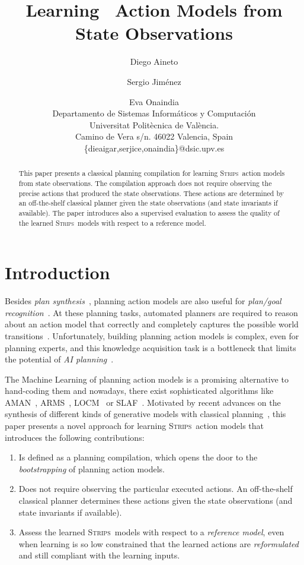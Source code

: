 \documentclass{article}
\title{Learning \strips\ Action Models from State Observations}
\author{Diego Aineto\and Sergio Jim\'enez\and Eva Onaindia\\
{\small Departamento de Sistemas Inform\'aticos y Computaci\'on}\\
{\small Universitat Polit\`ecnica de Val\`encia.}\\
{\small Camino de Vera s/n. 46022 Valencia, Spain}\\
{\small \{dieaigar,serjice,onaindia\}@dsic.upv.es}}
\newcommand{\strips}{\textsc{Strips}}     %
\begin{document}
\maketitle

\begin{abstract}
This paper presents a classical planning compilation for learning \strips\ action models from state observations. The compilation approach does not require observing the precise actions that produced the state observations. These actions are determined by an off-the-shelf classical planner given the state observations (and state invariants if available). The paper introduces also a supervised evaluation to assess the quality of the learned \strips\ models with respect to a reference model. 
\end{abstract}

\section{Introduction}
Besides {\em plan synthesis}~\cite{ghallab2004automated}, planning action models are also useful for {\em plan/goal recognition}~\cite{ramirez2012plan}. At these planning tasks, automated planners are required to reason about an action model that correctly and completely captures the possible world transitions~\cite{geffner:book:2013}. Unfortunately, building planning action models is complex, even for planning experts, and this knowledge acquisition task is a bottleneck that limits the potential of {\em AI planning}~\cite{kambhampati:modellite:AAAI2007}.

The Machine Learning of planning action models is a promising alternative to hand-coding them and nowadays, there exist sophisticated algorithms like {\sc AMAN}~\cite{zhuo2013action}, {\sc ARMS}~\cite{yang2007learning}, {\sc LOCM}~\cite{cresswell2013acquiring} or {\sc SLAF}~\cite{amir:alearning:JAIR08}. Motivated by recent advances on the synthesis of different kinds of generative models with classical planning~\cite{bonet2009automatic,segovia2016hierarchical,segovia2017generating}, this paper presents a novel approach for learning \strips\ action models that introduces the following contributions:
\begin{enumerate}
\item Is defined as a planning compilation, which opens the door to the {\em bootstrapping} of planning action models.
\item Does not require observing the particular executed actions. An off-the-shelf classical planner determines these actions given the state observations (and state invariants if available).
\item Assess the learned \strips\ models with respect to a {\em reference model}, even when learning is so low constrained that the learned actions are {\em reformulated} and still compliant with the learning inputs. 
\end{enumerate}
 
\end{document}
